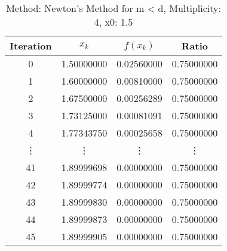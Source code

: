 \begin{table}
\centering
\caption{Method: Newton's Method for m < d, Multiplicity: 4, x0: 1.5}
\label{tab:table_Newton's_Method_for_m_<_d_4_1_5}
\begin{tabular}{c c c c}
\toprule
Iteration &      $x_k$ &   $f(x_k)$ &      Ratio \\
\midrule
        0 & 1.50000000 & 0.02560000 & 0.75000000 \\
        1 & 1.60000000 & 0.00810000 & 0.75000000 \\
        2 & 1.67500000 & 0.00256289 & 0.75000000 \\
        3 & 1.73125000 & 0.00081091 & 0.75000000 \\
        4 & 1.77343750 & 0.00025658 & 0.75000000 \\
   \vdots &     \vdots &     \vdots &     \vdots \\
       41 & 1.89999698 & 0.00000000 & 0.75000000 \\
       42 & 1.89999774 & 0.00000000 & 0.75000000 \\
       43 & 1.89999830 & 0.00000000 & 0.75000000 \\
       44 & 1.89999873 & 0.00000000 & 0.75000000 \\
       45 & 1.89999905 & 0.00000000 & 0.75000000 \\
\bottomrule
\end{tabular}
\end{table}
